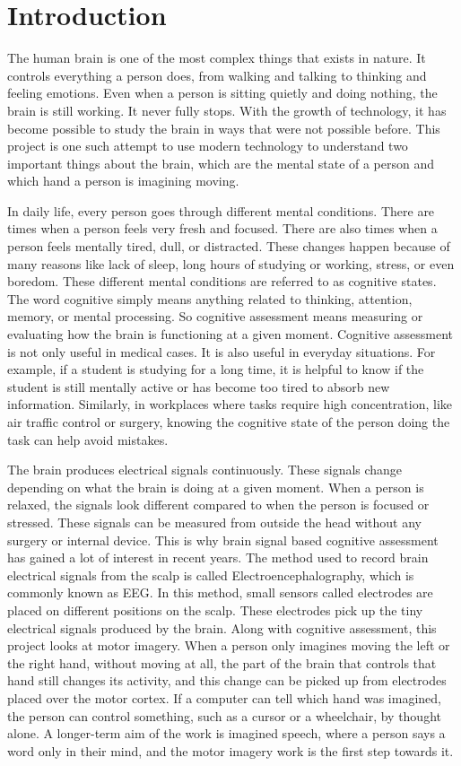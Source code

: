 \chapter{Introduction}
The human brain is one of the most complex things that exists in nature. It controls everything a person does, from walking and talking to thinking and feeling emotions. Even when a person is sitting quietly and doing nothing, the brain is still working. It never fully stops. With the growth of technology, it has become possible to study the brain in ways that were not possible before. This project is one such attempt to use modern technology to understand two important things about the brain, which are the mental state of a person and which hand a person is imagining moving.

In daily life, every person goes through different mental conditions. There are times when a person feels very fresh and focused. There are also times when a person feels mentally tired, dull, or distracted. These changes happen because of many reasons like lack of sleep, long hours of studying or working, stress, or even boredom. These different mental conditions are referred to as cognitive states. The word cognitive simply means anything related to thinking, attention, memory, or mental processing. So cognitive assessment means measuring or evaluating how the brain is functioning at a given moment. Cognitive assessment is not only useful in medical cases. It is also useful in everyday situations. For example, if a student is studying for a long time, it is helpful to know if the student is still mentally active or has become too tired to absorb new information. Similarly, in workplaces where tasks require high concentration, like air traffic control or surgery, knowing the cognitive state of the person doing the task can help avoid mistakes.

The brain produces electrical signals continuously. These signals change depending on what the brain is doing at a given moment. When a person is relaxed, the signals look different compared to when the person is focused or stressed. These signals can be measured from outside the head without any surgery or internal device. This is why brain signal based cognitive assessment has gained a lot of interest in recent years. The method used to record brain electrical signals from the scalp is called Electroencephalography, which is commonly known as EEG. In this method, small sensors called electrodes are placed on different positions on the scalp. These electrodes pick up the tiny electrical signals produced by the brain.
Along with cognitive assessment, this project looks at motor imagery. When a person only imagines moving the left or the right hand, without moving at all, the part of the brain that controls that hand still changes its activity, and this change can be picked up from electrodes placed over the motor cortex. If a computer can tell which hand was imagined, the person can control something, such as a cursor or a wheelchair, by thought alone. A longer-term aim of the work is imagined speech, where a person says a word only in their mind, and the motor imagery work is the first step towards it. 



